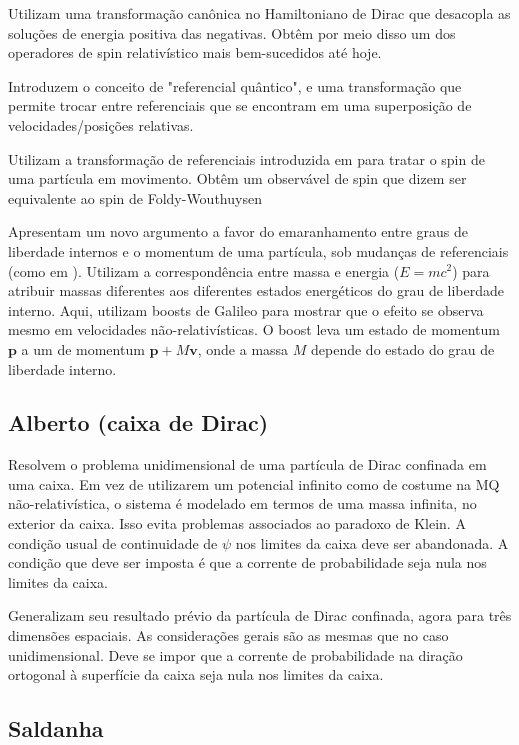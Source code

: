 \documentclass[11pt,a4paper,notitlepage]{article}
\begin{document}
\cite{foldy_wouthuysen_1950} Utilizam uma transformação canônica no Hamiltoniano de Dirac que desacopla as soluções de energia positiva das negativas. Obtêm por meio disso um dos operadores de spin relativístico mais bem-sucedidos até hoje.

\cite{brukner_2019QRF} Introduzem o conceito de "referencial quântico", e uma transformação que permite trocar entre referenciais que se encontram em uma superposição de velocidades/posições relativas.

\cite{brukner_2019spin} Utilizam a transformação de referenciais introduzida em \cite{brukner_2019QRF} para tratar o spin de uma partícula em movimento. Obtêm um observável de spin que dizem ser equivalente ao spin de Foldy-Wouthuysen

\cite{matsas_2019} Apresentam um novo argumento a favor do emaranhamento entre graus de liberdade internos e o momentum de uma partícula, sob mudanças de referenciais (como em \cite{peres2002}). Utilizam a correspondência entre massa e energia ($E = mc^2$) para atribuir massas diferentes aos diferentes estados energéticos do grau de liberdade interno. Aqui, utilizam boosts de Galileo para mostrar que o efeito se observa mesmo em velocidades não-relativísticas. O boost leva um estado de momentum $\mathbf{p}$ a um de momentum $\mathbf{p} + M\mathbf{v}$, onde a massa $M$ depende do estado do grau de liberdade interno.

\subsection*{Alberto (caixa de Dirac)}

\cite{alberto_1996} Resolvem o problema unidimensional de uma partícula de Dirac confinada em uma caixa. Em vez de utilizarem um potencial infinito como de costume na MQ não-relativística, o sistema é modelado em termos de uma massa infinita, no exterior da caixa. Isso evita problemas associados ao paradoxo de Klein. A condição usual de continuidade de $\psi$ nos limites da caixa deve ser abandonada. A condição que deve ser imposta é que a corrente de probabilidade seja nula nos limites da caixa.

\cite{alberto_2011} Generalizam seu resultado prévio da partícula de Dirac confinada, agora para três dimensões espaciais. As considerações gerais são as mesmas que no caso unidimensional. Deve se impor que a corrente de probabilidade na diração ortogonal à superfície da caixa seja nula nos limites da caixa.

\subsection*{Saldanha}
\end{document}

